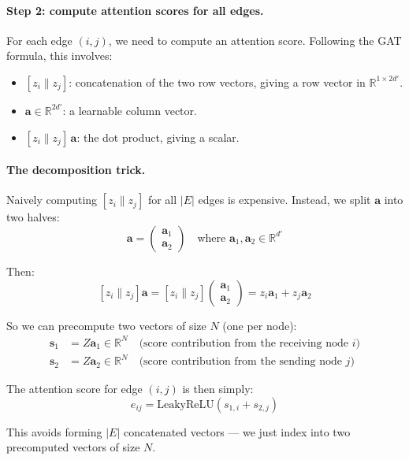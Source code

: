 \begin{notechapter}
\paragraph{Step 2: compute attention scores for all edges.}

For each edge $(i,j)$, we need to compute an attention score. Following
the GAT formula, this involves:
\begin{itemize}
    \item $[z_i \| z_j]$: concatenation of the two row vectors, giving
          a row vector in $\mathbb{R}^{1 \times 2d'}$.
    \item $\mathbf{a} \in \mathbb{R}^{2d'}$: a learnable column vector.
    \item $[z_i \| z_j] \, \mathbf{a}$: the dot product, giving a scalar.
\end{itemize}

\paragraph{The decomposition trick.} Naively computing $[z_i \| z_j]$ for
all $|E|$ edges is expensive. Instead, we split $\mathbf{a}$ into two
halves:
\[
\mathbf{a} = \begin{pmatrix} \mathbf{a}_1 \\ \mathbf{a}_2 \end{pmatrix}
\quad \text{where } \mathbf{a}_1, \mathbf{a}_2 \in \mathbb{R}^{d'}
\]

Then:
\[
[z_i \| z_j] \mathbf{a} = [z_i \| z_j] \begin{pmatrix} \mathbf{a}_1 \\ \mathbf{a}_2 \end{pmatrix}
= z_i \mathbf{a}_1 + z_j \mathbf{a}_2
\]

So we can precompute two vectors of size $N$ (one per node):
\begin{align*}
\mathbf{s}_1 &= Z \mathbf{a}_1 \in \mathbb{R}^{N} \quad \text{(score contribution from the receiving node $i$)} \\
\mathbf{s}_2 &= Z \mathbf{a}_2 \in \mathbb{R}^{N} \quad \text{(score contribution from the sending node $j$)}
\end{align*}

The attention score for edge $(i,j)$ is then simply:
\[
e_{ij} = \text{LeakyReLU}(s_{1,i} + s_{2,j})
\]

This avoids forming $|E|$ concatenated vectors --- we just index into two
precomputed vectors of size $N$.


\end{notechapter}
